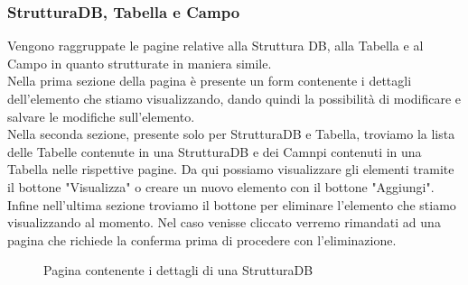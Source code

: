 \documentclass[5pt]{article}
\begin{document}
	    \subsubsection{StrutturaDB, Tabella e Campo}
	    Vengono raggruppate le pagine relative alla Struttura DB, alla Tabella e al Campo in quanto strutturate in maniera simile.\\
	    Nella prima sezione della pagina è presente un form contenente i dettagli dell'elemento che stiamo visualizzando, dando quindi la possibilità di modificare e salvare le modifiche sull'elemento.\\
	    Nella seconda sezione, presente solo per StrutturaDB e Tabella, troviamo la lista delle Tabelle contenute in una StrutturaDB e dei Camnpi contenuti in una Tabella nelle rispettive pagine. Da qui possiamo visualizzare gli elementi tramite il bottone "Visualizza" o creare un nuovo elemento con il bottone "Aggiungi".\\
	    Infine nell'ultima sezione troviamo il bottone per eliminare l'elemento che stiamo visualizzando al momento. Nel caso venisse cliccato verremo rimandati ad una pagina che richiede la conferma prima di procedere con l'eliminazione.
	    \begin{figure}[h]
	    	\centering
	    	\caption{Pagina contenente i dettagli di una StrutturaDB}
	    \end{figure}
	    
	    \newpage
\end{document}
